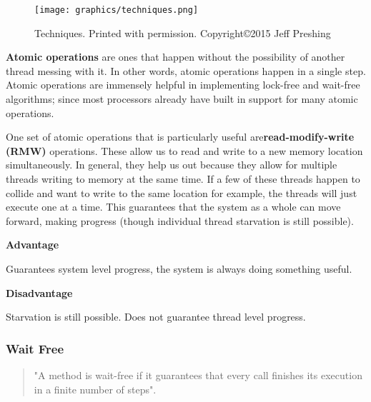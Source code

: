\documentclass[letterpaper, 12pt]{article}
\begin{document}
\begin{figure}
    \centering
	\texttt{[image: graphics/techniques.png]}
	\caption{Techniques. Printed with permission. Copyright\copyright 2015 Jeff Preshing}
	\citep{introlockfree}
\end{figure}

\newpage

{\bfseries Atomic operations} are ones that happen without the possibility of another thread 
messing with it. In other words, atomic operations happen in a single step. Atomic operations 
are immensely helpful in implementing lock-free and wait-free algorithms; since most 
processors already have built in support for many atomic operations. 

\par\vspace{\baselineskip}
One set of atomic operations that is particularly useful are{\bfseries read-modify-write (RMW)} 
operations. These allow us to read and write to a new memory location simultaneously. In general, 
they help us out because they allow for multiple threads writing to memory at the same time. 
If a few of these threads happen to collide and want to write to the same location for example, 
the threads will just execute one at a time. This guarantees that the system as a whole can move 
forward, making progress (though individual thread starvation is still possible).  

\par\vspace{\baselineskip}

{\bfseries Advantage} \par\vspace{\baselineskip}
Guarantees system level progress, the system is always doing something useful.


{\bfseries Disadvantage} 
\par\vspace{\baselineskip}
Starvation is still possible. Does not guarantee thread level progress. 

\par\vspace{\baselineskip}

\subsubsection{Wait Free}
\begin{quotation}
	"A method is wait-free if it guarantees that every call finishes its execution
	in a finite number of steps"\citep[p. 59]{artofmulti}.
\end{quotation}
\end{document}
